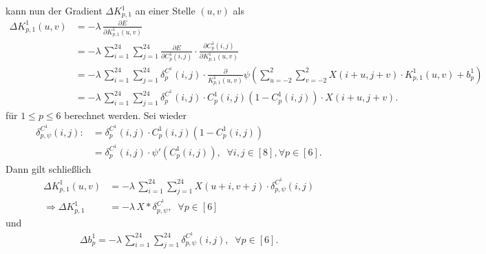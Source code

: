 kann nun der Gradient $\Delta K^1_{p,1}$ an einer Stelle $(u,v)$ als
\begin{align*}
    \Delta K^1_{p,1}(u,v) &= -\lambda \, \frac{\partial E}{\partial K^1_{p,1}(u,v)} \\
    &= -\lambda \, \sum_{i=1}^{24} \sum_{j=1}^{24} \frac{\partial E}{\partial C^1_p(i,j)} \cdot \frac{\partial C^1_p(i,j)}{\partial K_{p,1}^1(u,v)} \\
    &= -\lambda \, \sum_{i=1}^{24} \sum_{j=1}^{24} \delta_p^{C^1}(i,j) \cdot \frac{\partial}{ K^1_{p,1}(u,v)} \psi \left(\sum_{u=-2}^2 \sum_{v=-2}^2 X(i+u,j+v) \cdot K^1_{p,1}(u,v) +b_p^1\right) \\
    &= -\lambda \, \sum_{i=1}^{24} \sum_{j=1}^{24} \delta_p^{C^1}(i,j) \cdot C_p^1(i,j)\left(1-C_p^1(i,j)\right) \cdot X(i+u,j+v).
\end{align*}
für $1 \leq p \leq 6$ berechnet werden. Sei wieder
\begin{align*}
    \delta^{C^1}_{p,\psi}(i,j):&= \delta^{C^1}_p(i,j) \cdot C_p^1(i,j)\left(1- C_p^1(i,j)\right)\\
    &= \delta^{C^1}_p(i,j) \cdot \psi'(C^1_p(i,j)), \; \; \forall i,j \in [8], \forall p \in [6].
\end{align*}
Dann gilt schließlich
\begin{align*}
    \Delta K^1_{p,1}(u,v) &= - \lambda \, \sum_{i=1}^{24} \sum_{j=1}^{24} X(u+i,v+j) \cdot \delta^{C^1}_{p,\psi}(i,j) \\
     \Rightarrow \Delta K_{p,1}^1 &=- \lambda \, X \ast \delta^{C^1}_{p,\psi} , \; \; \forall p \in [6]
\end{align*} und 
\begin{align*}
    \Delta b_p^1 =-\lambda \, \sum_{i=1}^{24} \sum_{j=1}^{24} \delta_{p, \psi}^{C^1}(i,j), \; \; \forall p \in[6].
\end{align*}
